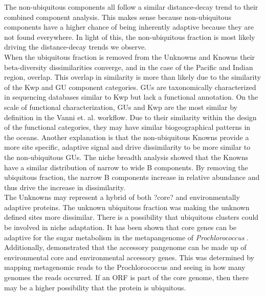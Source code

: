 The non-ubiquitous components all follow a similar distance-decay trend to their combined component analysis. This makes sense because non-ubiquitous components have a higher chance of being inherently adaptive because they are not found everywhere. In light of this, the non-ubiquitous fraction is most likely driving the distance-decay trends we observe.\\

When the ubiquitous fraction is removed from the Unknowns and Knowns their beta-diversity dissimilarities converge, and in the case of the Pacific and Indian region, overlap. This overlap in similarity is more than likely due to the similarity of the Kwp and GU component categories. GUs are taxonomically characterized in sequencing databases similar to Kwp but lack a functional annotation. On the scale of functional characterization, GUs and Kwp are the most similar by definition in the Vanni et. al. workflow. Due to their similarity within the design of the functional categories, they may have similar biogeographical patterns in the oceans. Another explanation is that the non-ubiquitous Knowns provide a more site specific, adaptive signal and drive dissimilarity to be more similar to the non-ubiquitous GUs. The niche breadth analysis showed that the Knowns have a similar distribution of narrow to wide B components. By removing the ubiquitous fraction, the narrow B components increase in relative abundance and thus drive the increase in dissimilarity.\\

The Unknowns may represent a hybrid of both ?core? and environmentally adaptive proteins. The unknown ubiquitous fraction was making the unknown defined sites more dissimilar. There is a possibility that ubiquitous clusters could be involved in niche adaptation. It has been shown that core genes can be adaptive for the sugar metabolism in the metapangenome of \textit{Prochlorococcus} \citep{Delmont_2018}. Additionally, \cite{Delmont_2018} demonstrated that the accessory pangenome can be made up of environmental core and environmental accessory genes. This was determined by mapping metagenomic reads to the Prochlorococcus and seeing in how many genomes the reads occurred. If an ORF is part of the core genome, then there may be a higher possibility that the protein is ubiquitous.\\

